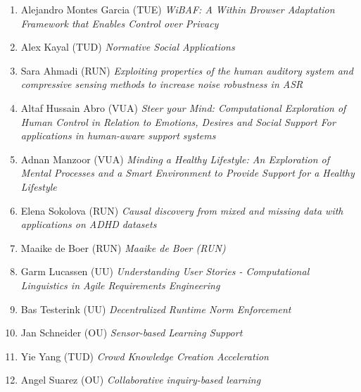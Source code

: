 \begin{multicols}{2}
\begin{scriptsize}
\begin{enumerate}[leftmargin=*,noitemsep,topsep=0pt,parsep=1pt,partopsep=0pt]
{}\item Alejandro Montes Garcia (TUE) \textit{WiBAF: A Within Browser Adaptation Framework that Enables Control over Privacy
}\item Alex Kayal (TUD) \textit{Normative Social Applications
}\item Sara Ahmadi (RUN) \textit{Exploiting properties of the human auditory system and compressive sensing methods to increase noise robustness in ASR
}\item Altaf Hussain Abro (VUA) \textit{Steer your Mind: Computational Exploration of Human Control in Relation to Emotions, Desires and Social Support For applications in human-aware support systems}
\item Adnan Manzoor (VUA) \textit{Minding a Healthy Lifestyle: An Exploration of Mental Processes and a Smart Environment to Provide Support for a Healthy Lifestyle
}\item Elena Sokolova (RUN) \textit{Causal discovery from mixed and missing data with applications on ADHD  datasets
}\item Maaike de Boer (RUN) \textit{Maaike de Boer (RUN)
}\item Garm Lucassen (UU) \textit{Understanding User Stories - Computational Linguistics in Agile Requirements Engineering
}\item Bas Testerink (UU) \textit{Decentralized Runtime Norm Enforcement
}\item Jan Schneider (OU) \textit{Sensor-based Learning Support
}\item Yie Yang (TUD) \textit{Crowd Knowledge Creation Acceleration
}\item Angel Suarez (OU) \textit{Collaborative inquiry-based learning}
\end{enumerate}


\end{scriptsize}
\end{multicols}
